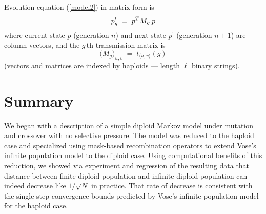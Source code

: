 Evolution equation (\ref{model2}) in matrix form is
\begin{equation}
\label{model3}
p_g^\prime \; = \; p^T M_g \,\hspace{0.01in} p
\end{equation}
where current state $p$ (generation $n$) and next state $p^\prime$
(generation $n+1$) are column vectors, and the $g\,$th transmission
matrix is
\begin{equation} \label{Mg}
\Big(M_g \Big)_{u,v} \; = \; t_{\langle u, v \rangle}(g)
\end{equation}
(vectors and matrices are indexed by haploids --- length $\ell$ binary
strings).





\section{Summary}
We began with a description of a simple diploid Markov model under mutation 
and crossover with no selective pressure. The model was reduced to the haploid case and specialized 
using mask-based recombination operators to extend Vose's infinite population model 
to the diploid case. Using computational benefits 
of this reduction, we showed via experiment and 
regression of the resulting data that distance between finite diploid population and infinite 
diploid population can indeed decrease like $1/\sqrt{N}$ in practice. That rate of decrease is consistent with 
the single-step convergence bounds predicted by 
Vose's infinite population model for the haploid case.

